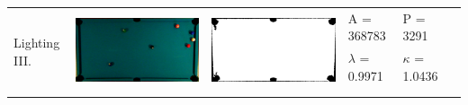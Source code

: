 \begin{tabular}{|l|c|c|l|l|c|}
\multirow{4}{*}{Lighting III.} & \multirow{4}{*}{\includegraphics[scale=0.1]{../images/1/14_img.png}} & \multirow{4}{*}{\includegraphics[scale=0.1]{../images/1/14_mask.png}} & A = 368783 & P = 3291 & \multirow{4}{*}{}\\ 
& & & $\lambda$ = 0.9971 & $\kappa$ = 1.0436 & \\
&&&&&\\
&&&&&\\
\hline


\end{tabular}
